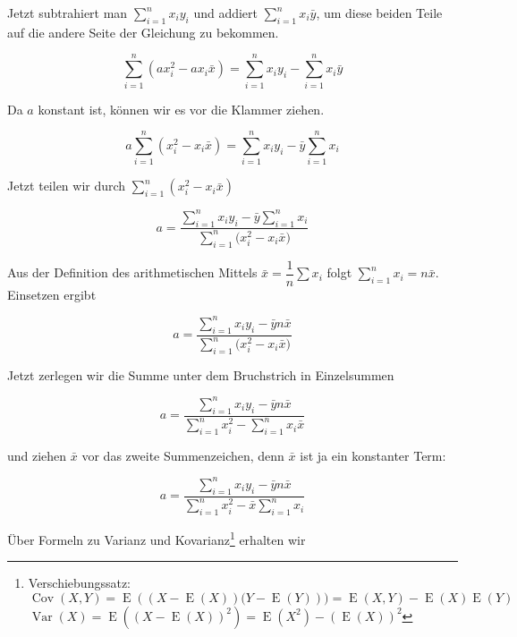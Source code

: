 \documentclass[ngerman, 12pt]{scrartcl}
\def\sm{\sum\limits_{i=1}^{n}}
\DeclareMathOperator{\cov}{Cov}
\DeclareMathOperator{\var}{Var}
\DeclareMathOperator{\E}{E}
\begin{document}
Jetzt subtrahiert man \(\sm x_iy_i\) und addiert \(\sm x_i\bar{y}\), um diese beiden Teile auf die andere Seite der Gleichung zu bekommen. %

\begin{equation}
\sm \left(ax_i^2 -ax_i\bar{x}\right) = \sm x_iy_i - \sm x_i\bar{y} 
\end{equation}

Da \(a\) konstant ist, können wir es vor die Klammer ziehen.

\begin{equation}
a \sm (x_i^2 -x_i\bar{x}) = \sm x_iy_i - \bar{y} \sm x_i 
\end{equation}

Jetzt teilen wir durch \(\sm (x_i^2 -x_i\bar{x})\)



\begin{equation}
a =  \dfrac{\sm x_iy_i - \bar{y} \sm x_i}{\sm \big(x_i^2 -x_i\bar{x}\big)} 
\end{equation}

Aus der Definition des arithmetischen Mittels $\bar{x} = \dfrac{1}{n}\sum x_i$ folgt $\sm x_i= n\bar{x}$. Einsetzen ergibt 

\begin{equation}
a =  \dfrac{\sm x_iy_i - \bar{y} n \bar{x}}{ \sm \big( x_i^2 -  x_i \bar{x} \big)}
\end{equation}


Jetzt zerlegen wir die Summe unter dem Bruchstrich in Einzelsummen

\begin{equation}
a =  \dfrac{\sm x_iy_i - \bar{y} n\bar{x}}{\sm x_i^2 - \sm x_i \bar{x}}
\end{equation}

und ziehen \(\bar{x}\) vor das zweite Summenzeichen, denn \(\bar{x}\) ist ja ein konstanter Term:

\begin{equation}
a =  \dfrac{\sm x_iy_i - \bar{y} n\bar{x}}{\sm x_i^2 - \bar{x} \sm x_i}
\end{equation}



Über Formeln zu Varianz und Kovarianz\footnote{Verschiebungssatz: \\ $\cov(X,Y) = \E \left((X - \E(X))(Y - \E(Y)\right)) =\E(X,Y)- \E(X)\E(Y)$ \\ $\var(X)=\E\left(\left(X-\E(X)\right)^2\right)=\E(X^2)-\left(\E(X)\right)^2$} erhalten wir
\end{document}
